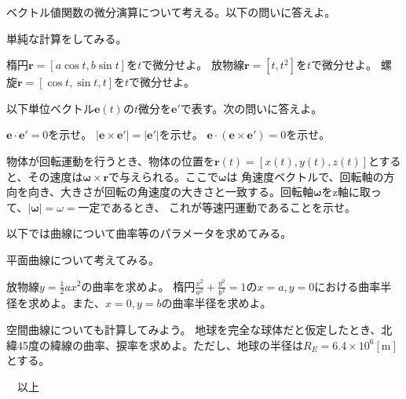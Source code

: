 \documentclass[a4j,dvipdfmx]{jsarticle}
\begin{document}
        ベクトル値関数の微分演算について考える。以下の問いに答えよ。
        \begin{qparts}
            \qpart 単純な計算をしてみる。
            \begin{qlist}
                \qitem 楕円$\bm{r}=[a\cos t,b\sin t]$を$t$で微分せよ。
                \qitem 放物線$\bm{r}=[t,t^2]$を$t$で微分せよ。
                \qitem 螺旋$\bm{r}=[\cos t,\sin t,t]$を$t$で微分せよ。
            \end{qlist}
            \qpart 以下単位ベクトル$\bm{e}(t)$の$t$微分を$\bm{e}'$で表す。次の問いに答えよ。
            \begin{qlist}
                \qitem $\bm{e}\cdot\bm{e}'=0$を示せ。
                \qitem $|\bm{e}\times\bm{e}'|=|\bm{e}'|$を示せ。
                \qitem $\bm{e}\cdot(\bm{e}\times\bm{e}')=0$を示せ。
            \end{qlist}
            \qpart 物体が回転運動を行うとき、物体の位置を$\bm{r}(t)=[x(t),y(t),z(t)]$とすると、その速度は$\bm{\omega}\times\bm{r}$で与えられる。ここで$\bm{\omega}$は
            角速度ベクトルで、回転軸の方向を向き、大きさが回転の角速度の大きさと一致する。回転軸$\bm{\omega}$をz軸に取って、$|\bm{\omega}|=\omega=一定$であるとき、
            これが等速円運動であることを示せ。
        \end{qparts}
    \clearpage
        以下では曲線について曲率等のパラメータを求めてみる。
        \begin{qparts}
            \qpart 平面曲線について考えてみる。
            \begin{qlist}
                \qitem 放物線$\displaystyle y=\frac{1}{2}ax^2$の曲率を求めよ。\vspace{0.5mm}
                \qitem 楕円$\displaystyle \frac{x^2}{a^2}+\frac{y^2}{b^2}=1$の$x=a,y=0$における曲率半径を求めよ。また、$x=0,y=b$の曲率半径を求めよ。
            \end{qlist}
            \qpart 空間曲線についても計算してみよう。
            地球を完全な球体だと仮定したとき、北緯45度の緯線の曲率、捩率を求めよ。ただし、地球の半径は$R_E=6.4\times10^6[\si{\meter}]$とする。
        \end{qparts}
    \hrulefill 　以上　\hrulefill
\end{document}
